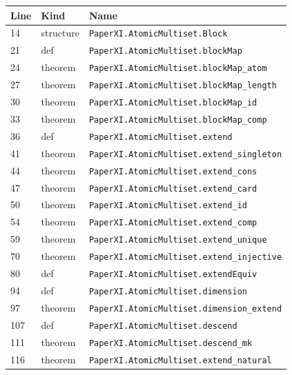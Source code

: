 \documentclass[10pt,oneside]{book}
\begin{document}
\begin{longtable}{@{}p{}p{}p{}@{}}\toprule Line&Kind&Name\\\midrule\endhead

14&structure&\nolinkurl{PaperXI.AtomicMultiset.Block}\\

21&def&\nolinkurl{PaperXI.AtomicMultiset.blockMap}\\

24&theorem&\nolinkurl{PaperXI.AtomicMultiset.blockMap_atom}\\

27&theorem&\nolinkurl{PaperXI.AtomicMultiset.blockMap_length}\\

30&theorem&\nolinkurl{PaperXI.AtomicMultiset.blockMap_id}\\

33&theorem&\nolinkurl{PaperXI.AtomicMultiset.blockMap_comp}\\

36&def&\nolinkurl{PaperXI.AtomicMultiset.extend}\\

41&theorem&\nolinkurl{PaperXI.AtomicMultiset.extend_singleton}\\

44&theorem&\nolinkurl{PaperXI.AtomicMultiset.extend_cons}\\

47&theorem&\nolinkurl{PaperXI.AtomicMultiset.extend_card}\\

50&theorem&\nolinkurl{PaperXI.AtomicMultiset.extend_id}\\

54&theorem&\nolinkurl{PaperXI.AtomicMultiset.extend_comp}\\

59&theorem&\nolinkurl{PaperXI.AtomicMultiset.extend_unique}\\

70&theorem&\nolinkurl{PaperXI.AtomicMultiset.extend_injective}\\

80&def&\nolinkurl{PaperXI.AtomicMultiset.extendEquiv}\\

94&def&\nolinkurl{PaperXI.AtomicMultiset.dimension}\\

97&theorem&\nolinkurl{PaperXI.AtomicMultiset.dimension_extend}\\

107&def&\nolinkurl{PaperXI.AtomicMultiset.descend}\\

111&theorem&\nolinkurl{PaperXI.AtomicMultiset.descend_mk}\\

116&theorem&\nolinkurl{PaperXI.AtomicMultiset.extend_natural}\\

\bottomrule\end{longtable}
\end{document}
